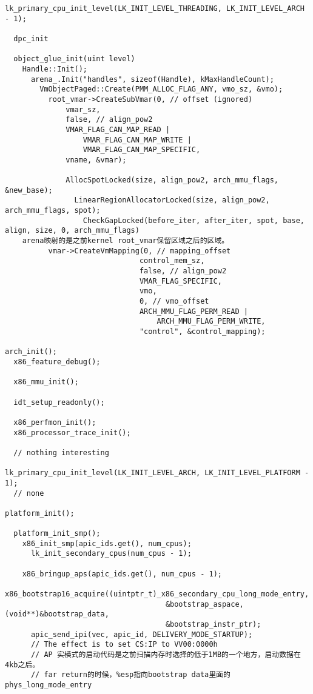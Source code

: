 \begin{verbatim}
lk_primary_cpu_init_level(LK_INIT_LEVEL_THREADING, LK_INIT_LEVEL_ARCH - 1);

  dpc_init

  object_glue_init(uint level)
    Handle::Init();
      arena_.Init("handles", sizeof(Handle), kMaxHandleCount);
        VmObjectPaged::Create(PMM_ALLOC_FLAG_ANY, vmo_sz, &vmo);
          root_vmar->CreateSubVmar(0, // offset (ignored)
              vmar_sz,
              false, // align_pow2
              VMAR_FLAG_CAN_MAP_READ |
                  VMAR_FLAG_CAN_MAP_WRITE |
                  VMAR_FLAG_CAN_MAP_SPECIFIC,
              vname, &vmar);

              AllocSpotLocked(size, align_pow2, arch_mmu_flags, &new_base);
                LinearRegionAllocatorLocked(size, align_pow2, arch_mmu_flags, spot);
                  CheckGapLocked(before_iter, after_iter, spot, base, align, size, 0, arch_mmu_flags)
    arena映射的是之前kernel root_vmar保留区域之后的区域。
          vmar->CreateVmMapping(0, // mapping_offset
                               control_mem_sz,
                               false, // align_pow2
                               VMAR_FLAG_SPECIFIC,
                               vmo,
                               0, // vmo_offset
                               ARCH_MMU_FLAG_PERM_READ |
                                   ARCH_MMU_FLAG_PERM_WRITE,
                               "control", &control_mapping);

arch_init();
  x86_feature_debug();

  x86_mmu_init();

  idt_setup_readonly();

  x86_perfmon_init();
  x86_processor_trace_init();

  // nothing interesting

lk_primary_cpu_init_level(LK_INIT_LEVEL_ARCH, LK_INIT_LEVEL_PLATFORM - 1);
  // none

platform_init();

  platform_init_smp();
    x86_init_smp(apic_ids.get(), num_cpus);
      lk_init_secondary_cpus(num_cpus - 1);

    x86_bringup_aps(apic_ids.get(), num_cpus - 1);
      x86_bootstrap16_acquire((uintptr_t)_x86_secondary_cpu_long_mode_entry,
                                     &bootstrap_aspace, (void**)&bootstrap_data,
                                     &bootstrap_instr_ptr);
      apic_send_ipi(vec, apic_id, DELIVERY_MODE_STARTUP);
      // The effect is to set CS:IP to VV00:0000h
      // AP 实模式的启动代码是之前扫描内存时选择的低于1MB的一个地方，启动数据在4kb之后。
      // far return的时候，%esp指向bootstrap data里面的phys_long_mode_entry




\end{verbatim}
